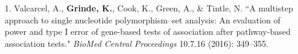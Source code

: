 \documentclass[margin]{res}
\begin{document}
\begin{resume}
\begin{itemize}
\item[1.] Valcarcel, A., \textbf{Grinde, K.}, Cook, K., Green, A., \& Tintle, N. ``A multistep approach to single nucleotide polymorphism--set analysis: An evaluation of power and type I error of gene-based tests of association after pathway-based association tests." \textit{BioMed Central Proceedings} 10.7.16 (2016): 349--355.  %

\end{itemize}
	
	
	

\end{resume}
\end{document}
